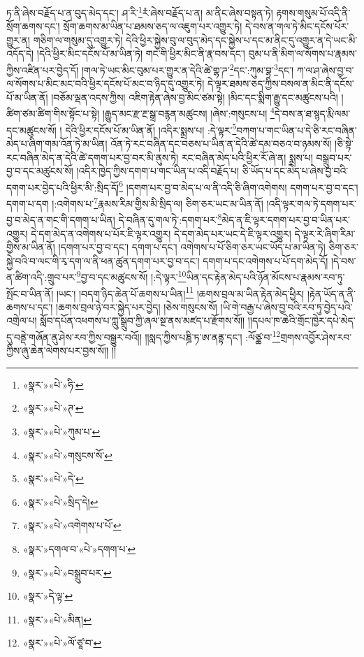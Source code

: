 ཏ་ནི་ཞེས་བརྗོད་པ་ན་བུད་མེད་དང་། ཤ་རི་\footnote{«སྣར་»«པེ་»ཧི་}རཾ་ཞེས་བརྗོད་པ་ན། མ་ནིང་ཞེས་བསྟན་ཏེ། རྟགས་གསུམ་པོ་འདི་ནི་སྲོག་ཆགས་དང་། སྲོག་ཆགས་མ་ཡིན་པ་ཐམས་ཅད་ལ་འཇུག་པར་འགྱུར་ཏེ། དེ་བས་ན་གལ་ཏེ་མིང་དངོས་པོར་གྱུར་ན། གཅིག་ལ་གསུམ་དུ་འགྱུར་ཏེ། དེའི་ཕྱིར་སྐྱེས་བུ་ལ་བུད་མེད་དང་སྐྱེས་པ་དང་མ་ནིང་དུ་འགྱུར་ན་དེ་ཡང་མི་འདོད་དེ། །དེའི་ཕྱིར་མིང་དངོས་པོ་མ་ཡིན་ཏེ། གང་གི་ཕྱིར་མིང་ནི་རྣ་བས་དང་། བུམ་པ་ནི་མིག་ལ་སོགས་པ་རྣམས་ཀྱིས་འཛིན་པར་བྱེད་དོ། །གལ་ཏེ་ཡང་མིང་བུམ་པར་གྱུར་ན་དེའི་ཚེ་གྷ་ཌ་\footnote{«སྣར་»«པེ་»ཊ་}དང་:ཀུམ་བྷ་\footnote{«སྣར་»«པེ་»ཀུམ་པ་}དང་། ཀ་ལ་ཤ་ཞེས་བྱ་བ་ལ་སོགས་པ་མིང་མང་བའི་ཕྱིར་དངོས་པོ་མང་བ་ཉིད་དུ་འགྱུར་ཏེ། དེ་ལྟར་ཐམས་ཅད་ཀྱིས་བསལ་ན་མིང་ནི་དངོས་པོ་མ་ཡིན་ནོ། །བཅོམ་ལྡན་འདས་ཀྱིས། འཇིག་རྟེན་ཞེས་བྱ་མིང་ཙམ་སྟེ། །མིང་དང་སྨིག་རྒྱུ་དང་མཚུངས་པའི། །ཚིག་ཙམ་ཚིག་གིས་སྟོང་པ་སྟེ། །རྒྱུད་མང་རྫ་རྔ་སྒྲ་བརྙན་མཚུངས། །ཞེས་:གསུངས་པ། \footnote{«སྣར་»«པེ་»གསུངས་སོ་}དེ་བས་ན་ཐ་སྙད་རྨི་ལམ་དང་མཚུངས་སོ། །
དེའི་ཕྱིར་དངོས་པོ་མ་ཡིན་ནོ། །འདིར་སྨྲས་པ། :དེ་ལྟར་\footnote{«སྣར་»«པེ་»དེ་}བཀག་པ་གང་ཡིན་པ་དེ་ཅི་རང་བཞིན་མེད་པ་ཞིག་གམ་འོན་ཏེ་མ་ཡིན། འོན་ཏེ་རང་བཞིན་དང་བཅས་པ་ཡིན་ན་དེའི་ཚེ་དམ་བཅའ་བ་ཉམས་སོ། །ཅི་སྟེ་རང་བཞིན་མེད་ན་དེའི་ཚེ་དགག་པར་བྱ་བར་མི་ནུས་ཏེ། རང་བཞིན་མེད་པའི་ཕྱིར་རོ་ཞེ་ན། སྨྲས་པ། བསྒྲུབ་པར་བྱ་བ་དང་མཚུངས་སོ། །འདིར་ཁྱེད་ཀྱིས་དགག་པ་གང་ཡིན་པ་འདི་བརྗོད་པ། ཅི་ཡོད་པ་དང་མེད་པ་ཞེས་བྱ་བའི་དགག་པར་བྱེད་པའི་ཕྱིར་མི་:སྲིད་དོ།\footnote{«སྣར་»«པེ་»སྲིད་དེ།} །དགག་པར་བྱ་བ་མེད་པ་ལ་ནི་འདི་ཅི་ཞིག་འགེགས། དགག་པར་བྱ་བ་དང་། དགག་པ་དག །:འགེགས་པ་\footnote{«སྣར་»«པེ་»འགེགས་པ་པོ་}རྣམས་རིམ་གྱིས་མི་སྲིད་ལ། ཅིག་ཅར་ཡང་མ་ཡིན་ནོ། །འདི་ལྟར་གལ་ཏེ་དགག་པར་བྱ་བ་མེད་ན་གང་གི་དགག་པ་ཡིན། དེ་བཞིན་དུ་གལ་ཏེ་:དགག་པར་\footnote{«སྣར་»དགལ་བ་«པེ་»དགག་པ་}མེད་ན་ཇི་ལྟར་དགག་པར་བྱ་བ་ཡིན་པར་འགྱུར། དེ་དག་མེད་ན་འགེགས་པ་པོར་ཇི་ལྟར་འགྱུར། དེ་དག་མེད་པར་ཡང་དེ་ཇི་ལྟར་འགྱུར། དེ་ལྟར་རེ་ཞིག་རིམ་གྱིས་མ་ཡིན་ནོ། །དགག་པར་བྱ་བ་དང་། དགག་པ་དང་། འགེགས་པ་པོ་ཅིག་ཅར་ཡང་ཡོད་པ་མ་ཡིན་ཏེ། ཅིག་ཅར་སྐྱེ་བའི་བ་ལང་གི་རྭ་དག་ལ་ནི་ཕན་ཚུན་དགག་པར་བྱ་བ་དང་། དགག་པ་དང་འགེགས་པ་པོ་དག་མེད་དོ། །དེ་བས་ན་ཚིག་འདི་:གྲུབ་པར་\footnote{«སྣར་»«པེ་»བསྒྲུབ་པར་}བྱ་བ་དང་མཚུངས་སོ། །:དེ་ལྟར་\footnote{«སྣར་»དེ་ལྟ་}ཡིན་དང་རྟེན་མེད་པའི་ཉོན་མོངས་པ་རྣམས་རབ་ཏུ་སྤོང་བ་ཡིན་ནོ། །ཡང་། །བདག་ཉིད་ཆེན་པོ་ཆགས་པ་ཡིན།\footnote{«སྣར་»«པེ་»མིན།} །ཆགས་བྲལ་མ་ཡིན་རྟེན་མེད་ཕྱིར། །རྟེན་ཡོད་ན་ནི་ཆགས་པ་དང་། །ཆགས་བྲལ་ཉེ་བར་སྐྱེད་པར་བྱེད། །ཅེས་གསུངས་སོ། །ཡི་གེ་བརྒྱ་པ་ཞེས་བྱ་བའི་རབ་ཏུ་བྱེད་པའི་འགྲེལ་པ། སློབ་དཔོན་འཕགས་པ་ཀླུ་སྒྲུབ་ཀྱི་ཞལ་སྔ་ནས་མཛད་པ་རྫོགས་སོ།། །།དཔལ་ཁ་ཆེའི་གྲོང་ཁྱེར་དཔེ་མེད་དུ་བནྡེ་གཞོན་ནུ་ཤེས་རབ་ཀྱིས་བསྒྱུར་བའོ།། །།སླད་ཀྱིས་པཎྜི་ཏ་ཨ་ནནྟ་དང་། :ལོཙྪ་བ་\footnote{«སྣར་»«པེ་»ལོ་ཙཱ་བ་}གྲགས་འབྱོར་ཤེས་རབ་ཀྱིས་ཞུ་ཆེན་ལེགས་པར་བྱས་སོ།། །།